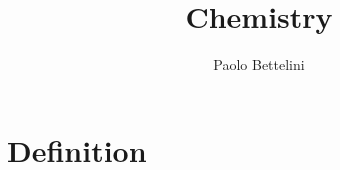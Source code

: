 \documentclass[a4paper]{article}
\title{Chemistry}
\author{Paolo Bettelini}
\date{}
\begin{document}
\maketitle
\tableofcontents
\pagebreak

\section{Definition}



\end{document}
